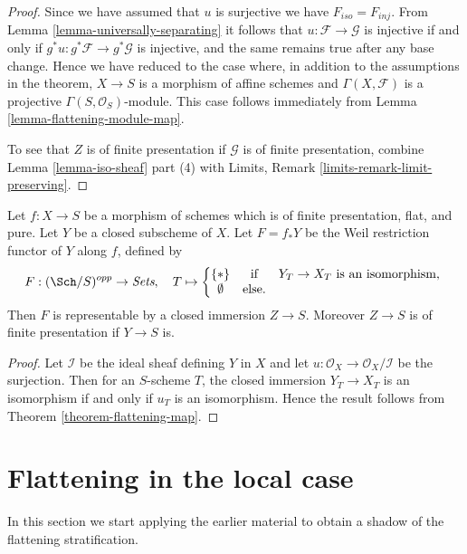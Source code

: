 \begin{proof}
\medskip\noindent
Since we have assumed that $u$ is surjective we have $F_{iso} = F_{inj}$. From
Lemma \ref{lemma-universally-separating}
it follows that $u : \mathcal{F} \to \mathcal{G}$ is injective if and only if
$g^*u : g^*\mathcal{F} \to g^*\mathcal{G}$ is injective, and the same remains
true after any base change. Hence we have reduced to the case where,
in addition to the assumptions in the theorem, $X \to S$ is a morphism of
affine schemes and $\Gamma(X, \mathcal{F})$ is a projective
$\Gamma(S, \mathcal{O}_S)$-module. This case follows immediately from
Lemma \ref{lemma-flattening-module-map}.

\medskip\noindent
To see that $Z$ is of finite presentation if $\mathcal{G}$ is of finite
presentation, combine
Lemma \ref{lemma-iso-sheaf} part (4)
with
Limits, Remark \ref{limits-remark-limit-preserving}.
\end{proof}

\begin{lemma}
\label{lemma-Weil-restriction-closed-subschemes}
Let $f:X\to S$ be a morphism of schemes which is of finite presentation,
flat, and pure. Let $Y$ be a closed subscheme of $X$. Let $F=f_*Y$ be the
Weil restriction functor of $Y$ along $f$, defined by
$$
F : (\Sch/S)^{opp} \to \textit{Sets}, \quad
T \mapsto
\left\{
\begin{matrix}
\{*\} & \text{if} & Y_T\to X_T \text{ is an isomorphism, }\\
\emptyset & \text{else.} &
\end{matrix}
\right.
$$
Then $F$ is representable by a closed immersion $Z\to S$. Moreover
$Z\to S$ is of finite presentation if $Y\to S$ is.
\end{lemma}

\begin{proof}
Let $\mathcal{I}$ be the ideal sheaf defining $Y$ in $X$ and let
$u:\mathcal{O}_X\to\mathcal{O}_X/\mathcal{I}$ be the surjection.
Then for an $S$-scheme $T$, the closed immersion $Y_T\to X_T$
is an isomorphism if and only if $u_T$ is an isomorphism. Hence
the result follows from
Theorem \ref{theorem-flattening-map}.
\end{proof}



\section{Flattening in the local case}
\label{section-flattening-local}

\noindent
In this section we start applying the earlier material to obtain a
shadow of the flattening stratification.

